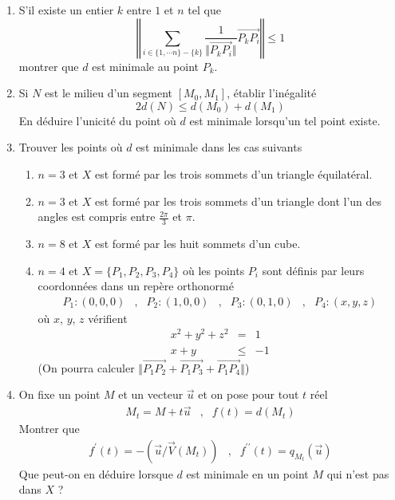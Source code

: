 \begin{enumerate}
\item S'il existe un entier $k$ entre $1$ et $n$ tel que
\begin{displaymath}
 \left \Vert \sum _{i\in \{1,\cdots n\}-\{k\}} \frac{1}{\Vert \overrightarrow{P_kP_i} \Vert} \overrightarrow{P_kP_i} \right \Vert \leq 1
\end{displaymath}
montrer que $d$ est minimale au point $P_k$.
\item Si $N$ est le milieu d'un segment $[M_0, M_1]$, établir l'inégalité
\begin{displaymath}
 2d(N) \leq d(M_0) + d(M_1)
\end{displaymath}
En déduire l'unicité du point où $d$ est minimale lorsqu'un tel point existe.
\item Trouver les points où $d$ est minimale dans les cas suivants
\begin{enumerate}
 \item $n=3$ et $X$ est formé par les trois sommets d'un triangle équilatéral.
 \item $n=3$ et $X$ est formé par les trois sommets d'un triangle dont l'un des angles est compris entre $\frac{2\pi}{3}$ et $\pi$.
 \item $n=8$ et $X$ est formé par les huit sommets d'un cube.
 \item $n=4$ et $X=\{P_1,P_2,P_3,P_4\}$ où les points $P_i$ sont définis par leurs coordonnées dans un repère orthonormé
\begin{align*}
 P_1:(0,0,0) &,& P_2:(1,0,0) &,& P_3:(0,1,0) &,& P_4:(x,y,z)
\end{align*}
où $x$, $y$, $z$ vérifient
\begin{eqnarray*}
  x^2 + y^2 +z^2 &=& 1 \\
  x +y &\leq& -1 
\end{eqnarray*}
(On pourra calculer 
$\Vert \overrightarrow{P_1 P_2}+ \overrightarrow{P_1 P_3}+\overrightarrow{P_1 P_4}\Vert$)
\end{enumerate}
\item On fixe un point $M$ et un vecteur $\overrightarrow u$ et on pose pour tout $t$ réel
\begin{align*}
 M_t = M+t\overrightarrow u &,& f(t)= d(M_t)
\end{align*}
Montrer que 
\begin{align*}
 f^\prime (t) = -(\overrightarrow u/ \overrightarrow V (M_t)) &,&
 f^{\prime \prime} (t) = q_{M_t}(\overrightarrow u)
\end{align*}
Que peut-on en déduire lorsque $d$ est minimale en un point $M$ qui n'est pas dans $X$ ?
\end{enumerate}
